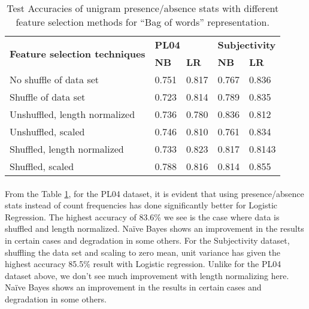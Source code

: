 \documentclass[a4paper,26pt]{article}
\begin{document}
\begin{table}[H]
\centering
\begin{tabular}{|l|l|l|l|l|}
\hline
\multirow{2}{*}{\textbf{Feature selection techniques}} & \multicolumn{2}{l|}{\textbf{PL04}} & \multicolumn{2}{l|}{\textbf{Subjectivity}} \\ \cline{2-5} 
                                                       & \textbf{NB}      & \textbf{LR}     & \textbf{NB}          & \textbf{LR}         \\ \hline
No shuffle of data set                                 & 0.751            & 0.817           & 0.767                & 0.836               \\ \hline
Shuffle of data set                                    & 0.723            & 0.814           & 0.789                & 0.835               \\ \hline
Unshuffled, length normalized                          & 0.736            & 0.780           & 0.836                & 0.812               \\ \hline
Unshuffled, scaled                                     & 0.746            & 0.810           & 0.761                & 0.834               \\ \hline
Shuffled, length normalized                            & 0.733            & 0.823           & 0.817                & 0.8143              \\ \hline
Shuffled, scaled                                       & 0.788            & 0.816           & 0.814                & 0.855               \\ \hline
\end{tabular}
\caption{Test Accuracies of unigram presence/absence stats with different feature selection methods for ``Bag of words'' representation.}
\label{tab:testacc2}
\end{table}

\paragraph{}
From the Table \ref{tab:testacc2}, for the PL04 dataset, it is evident that using presence/absence stats instead of count frequencies has done significantly better for Logistic Regression. The highest accuracy of 83.6\% we see is the case where data is shuffled and length normalized. Na\"{i}ve Bayes shows an improvement in the results in certain cases and degradation in some others. For the Subjectivity dataset, shuffling the data set and scaling to zero mean, unit variance has given the highest accuracy 85.5\% result with Logistic regression. Unlike for the PL04 dataset above, we don't see much improvement with length normalizing here. Na\"{i}ve Bayes shows an improvement in the results in certain cases and degradation in some others.
\end{document}
